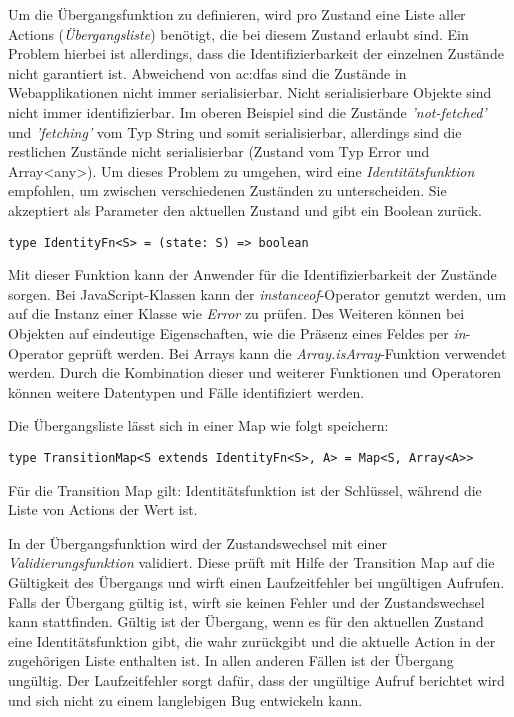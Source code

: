 Um die Übergangsfunktion zu definieren, wird pro Zustand eine Liste aller Actions (\textit{Übergangsliste}) benötigt, die bei diesem Zustand erlaubt sind. Ein Problem hierbei ist allerdings, dass die Identifizierbarkeit der einzelnen Zustände nicht garantiert ist. Abweichend von \acrshort{ac:dfa}s sind die Zustände in Webapplikationen nicht immer serialisierbar. Nicht serialisierbare Objekte sind nicht immer identifizierbar. Im oberen Beispiel sind die Zustände \textit{'not-fetched'} und \textit{'fetching'} vom Typ String und somit serialisierbar, allerdings sind die restlichen Zustände nicht serialisierbar (Zustand vom Typ Error und Array<any>). Um dieses Problem zu umgehen, wird eine \textit{Identitätsfunktion} empfohlen, um zwischen verschiedenen Zuständen zu unterscheiden. Sie akzeptiert als Parameter den aktuellen Zustand und gibt ein Boolean zurück.

\begin{lstlisting}
type IdentityFn<S> = (state: S) => boolean
\end{lstlisting}


Mit dieser Funktion kann der Anwender für die Identifizierbarkeit der Zustände sorgen. Bei JavaScript-Klassen kann der \textit{instanceof}-Operator genutzt werden, um auf die Instanz einer Klasse wie \textit{Error} zu prüfen.\cite{jsInstanceofOperator} Des Weiteren können bei Objekten auf eindeutige Eigenschaften, wie die Präsenz eines Feldes per \textit{in}-Operator geprüft werden.\cite{jsInOperator} Bei Arrays kann die \textit{Array.isArray}-Funktion verwendet werden.\cite{jsIsArray} Durch die Kombination dieser und weiterer Funktionen und Operatoren können weitere Datentypen und Fälle identifiziert werden.

Die Übergangsliste lässt sich in einer Map wie folgt speichern:

\begin{lstlisting}
type TransitionMap<S extends IdentityFn<S>, A> = Map<S, Array<A>>
\end{lstlisting}

Für die Transition Map gilt: Identitätsfunktion ist der Schlüssel, während die Liste von Actions der Wert ist.

In der Übergangsfunktion wird der Zustandswechsel mit einer \textit{Validierungsfunktion} validiert. Diese prüft mit Hilfe der Transition Map auf die Gültigkeit des Übergangs und wirft einen Laufzeitfehler bei ungültigen Aufrufen. Falls der Übergang gültig ist, wirft sie keinen Fehler und der Zustandswechsel kann stattfinden. Gültig ist der Übergang, wenn es für den aktuellen Zustand eine Identitätsfunktion gibt, die wahr zurückgibt und die aktuelle Action in der zugehörigen Liste enthalten ist. In allen anderen Fällen ist der Übergang ungültig. Der Laufzeitfehler sorgt dafür, dass der ungültige Aufruf berichtet wird und sich nicht zu einem langlebigen Bug entwickeln kann.

